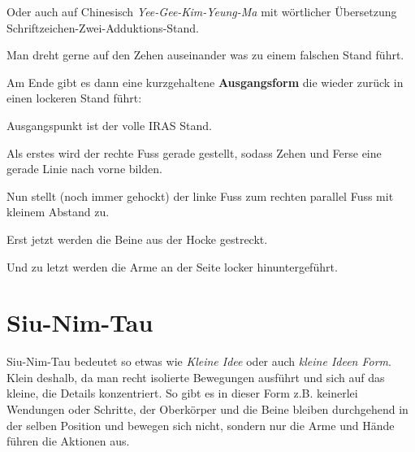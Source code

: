 	
	\begin{WTCommonBegriff}
		Oder auch auf Chinesisch \textit{Yee-Gee-Kim-Yeung-Ma} mit w\"ortlicher \"Ubersetzung Schriftzeichen-Zwei-Adduktions-Stand.
	\end{WTCommonBegriff}
	
\begin{WTCommonNoob}
	Man dreht gerne auf den Zehen auseinander was zu einem falschen Stand f\"uhrt.
\end{WTCommonNoob}



Am Ende gibt es dann eine kurzgehaltene \textbf{Ausgangsform} die wieder zur\"uck in einen lockeren Stand f\"uhrt:

\begin{WTalphenum}
	\item Ausgangspunkt ist der volle IRAS Stand.
	\item Als erstes wird der rechte Fuss gerade gestellt, sodass Zehen und Ferse eine gerade Linie nach vorne bilden.
	\item Nun stellt (noch immer gehockt) der linke Fuss zum rechten parallel Fuss mit kleinem Abstand zu.
	\item Erst jetzt werden die Beine aus der Hocke gestreckt.
	\item Und zu letzt werden die Arme an der Seite locker hinuntergef\"uhrt.
\end{WTalphenum}


\section{Siu-Nim-Tau}

Siu-Nim-Tau bedeutet so etwas wie \textit{Kleine Idee} oder auch \textit{kleine Ideen Form}. Klein deshalb, da man recht isolierte Bewegungen ausf\"uhrt und sich auf das kleine, die Details konzentriert. So gibt es in dieser Form z.B. keinerlei Wendungen oder Schritte, der Oberk\"orper und die Beine bleiben durchgehend in der selben Position und bewegen sich nicht, sondern nur die Arme und H\"ande f\"uhren die Aktionen aus.

